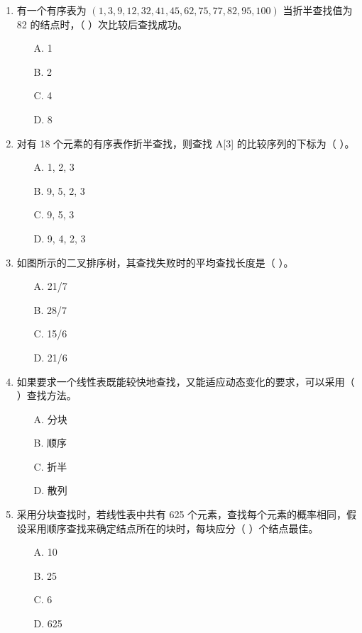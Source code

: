\documentclass[12pt, a4paper]{article}
\begin{document}
\begin{enumerate}
    \item 有一个有序表为 $(1, 3, 9, 12, 32, 41, 45, 62, 75, 77, 82, 95, 100)$ 当折半查找值为 82 的结点时，（ ）次比较后查找成功。
    \begin{enumerate}
        \item[A.] 1
        \item[B.] 2
        \item[C.] 4
        \item[D.] 8
    \end{enumerate}
    
    \item 对有 18 个元素的有序表作折半查找，则查找 A[3] 的比较序列的下标为（ ）。
    \begin{enumerate}
        \item[A.] 1, 2, 3
        \item[B.] 9, 5, 2, 3
        \item[C.] 9, 5, 3
        \item[D.] 9, 4, 2, 3
    \end{enumerate}
    
    \item 如图所示的二叉排序树，其查找失败时的平均查找长度是（ ）。
    \begin{enumerate}
        \item[A.] 21/7
        \item[B.] 28/7
        \item[C.] 15/6
        \item[D.] 21/6
    \end{enumerate}
    
    \item 如果要求一个线性表既能较快地查找，又能适应动态变化的要求，可以采用（ ）查找方法。
    \begin{enumerate}
        \item[A.] 分块
        \item[B.] 顺序
        \item[C.] 折半
        \item[D.] 散列
    \end{enumerate}
    
    \item 采用分块查找时，若线性表中共有 625 个元素，查找每个元素的概率相同，假设采用顺序查找来确定结点所在的块时，每块应分（ ）个结点最佳。
    \begin{enumerate}
        \item[A.] 10
        \item[B.] 25
        \item[C.] 6
        \item[D.] 625
    \end{enumerate}
    

\end{enumerate}
\end{document}
